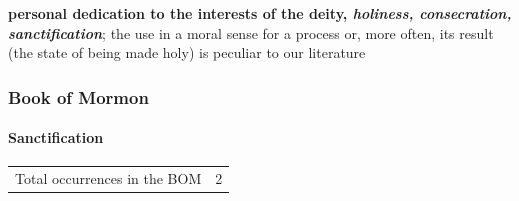 				\begin{compactdesc}
					\item[BDAG 9a] \textbf{}
						\begin{compactitem}
							\item \textbf{personal dedication to the interests of the deity, \textit{holiness, consecration, sanctification}}; the use in a moral sense for a process or, more often, its result (the state of being made holy) is peculiar to our literature
						\end{compactitem}
					\item[CGL , PDF ] \textbf{}
						\begin{compactitem}
							\item 
						\end{compactitem}
					\item[LSJ , PDF ] \textbf{}
						\begin{compactitem}
							\item 
						\end{compactitem}
				\end{compactdesc}
				
				
				
		
	\subsubsection{Book of Mormon} %
		\label{SANCTIFICATION-BOM}
		
		\paragraph{Sanctification}
	
			\begin{tabular}{ll}
				Total occurrences in the BOM & 2
			\end{tabular}
			
